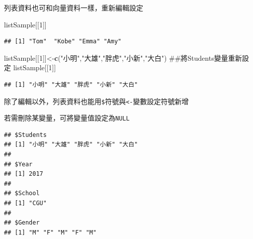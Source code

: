 \documentclass[]{book}
\newenvironment{Shaded}{\begin{snugshade}}{\end{snugshade}}
\newcommand{\KeywordTok}[1]{\textcolor[rgb]{0.13,0.29,0.53}{\textbf{{#1}}}}
\newcommand{\DecValTok}[1]{\textcolor[rgb]{0.00,0.00,0.81}{{#1}}}
\newcommand{\StringTok}[1]{\textcolor[rgb]{0.31,0.60,0.02}{{#1}}}
\newcommand{\OtherTok}[1]{\textcolor[rgb]{0.56,0.35,0.01}{{#1}}}
\newcommand{\NormalTok}[1]{{#1}}
\theoremstyle{definition}
\theoremstyle{definition}
\theoremstyle{remark}
\begin{document}
列表資料也可和向量資料一樣，重新編輯設定

\begin{Shaded}
\begin{Highlighting}[]
\NormalTok{listSample[[}\DecValTok{1}\NormalTok{]] }
\end{Highlighting}
\end{Shaded}

\begin{verbatim}
## [1] "Tom"  "Kobe" "Emma" "Amy"
\end{verbatim}

\begin{Shaded}
\begin{Highlighting}[]
\NormalTok{listSample[[}\DecValTok{1}\NormalTok{]]<-}\KeywordTok{c}\NormalTok{(}\StringTok{"小明"}\NormalTok{,}\StringTok{"大雄"}\NormalTok{,}\StringTok{"胖虎"}\NormalTok{,}\StringTok{"小新"}\NormalTok{,}\StringTok{"大白"}\NormalTok{) ##將Students變量重新設定}
\NormalTok{listSample[[}\DecValTok{1}\NormalTok{]] }
\end{Highlighting}
\end{Shaded}

\begin{verbatim}
## [1] "小明" "大雄" "胖虎" "小新" "大白"
\end{verbatim}

除了編輯以外，列表資料也能用\texttt{\$}符號與\texttt{\textless{}-}變數設定符號新增

\begin{Shaded}
\end{Shaded}

若需刪除某變量，可將變量值設定為\texttt{NULL}

\begin{Shaded}
\end{Shaded}

\begin{verbatim}
## $Students
## [1] "小明" "大雄" "胖虎" "小新" "大白"
## 
## $Year
## [1] 2017
## 
## $School
## [1] "CGU"
## 
## $Gender
## [1] "M" "F" "M" "F" "M"
\end{verbatim}
\end{document}
